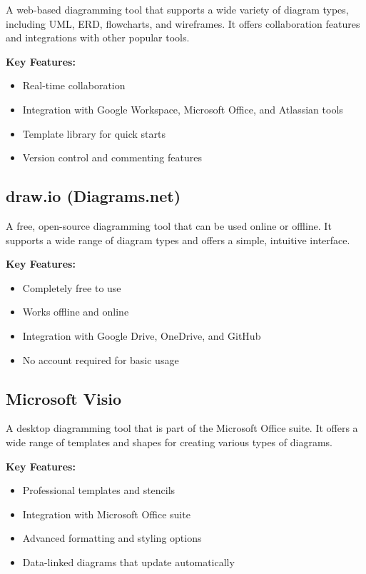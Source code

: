 A web-based diagramming tool that supports a wide variety of diagram types, including UML, ERD, flowcharts, and wireframes. It offers collaboration features and integrations with other popular tools.

\textbf{Key Features:}
\begin{itemize}
  \item Real-time collaboration
  \item Integration with Google Workspace, Microsoft Office, and Atlassian tools
  \item Template library for quick starts
  \item Version control and commenting features
\end{itemize}

\subsection{draw.io (Diagrams.net)}

A free, open-source diagramming tool that can be used online or offline. It supports a wide range of diagram types and offers a simple, intuitive interface.

\textbf{Key Features:}
\begin{itemize}
  \item Completely free to use
  \item Works offline and online
  \item Integration with Google Drive, OneDrive, and GitHub
  \item No account required for basic usage
\end{itemize}

\subsection{Microsoft Visio}

A desktop diagramming tool that is part of the Microsoft Office suite. It offers a wide range of templates and shapes for creating various types of diagrams.

\textbf{Key Features:}
\begin{itemize}
  \item Professional templates and stencils
  \item Integration with Microsoft Office suite
  \item Advanced formatting and styling options
  \item Data-linked diagrams that update automatically
\end{itemize}

